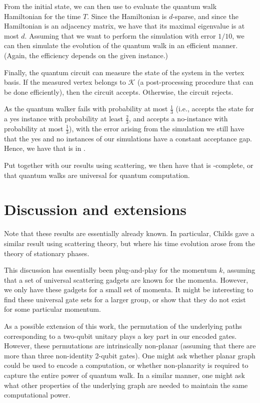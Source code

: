\documentclass[../thesis-main/thesis-main]{subfiles}
\begin{document}
From the initial state, we can then use  to evaluate the quantum walk Hamiltonian for the time $T$.  Since the Hamiltonian is $d$-sparse, and since the Hamiltonian is an adjacency matrix, we have that its maximal eigenvalue is at most $d$.  Assuming that we want to perform the simulation with error $1/10$, we can then simulate the evolution of the quantum walk in an efficient manner.  (Again, the efficiency depends on the given instance.)

Finally, the quantum circuit can measure the state of the system in the vertex basis.  If the measured vertex belongs to $\mathcal{K}$ (a post-processing procedure that can be done efficiently), then the circuit accepts.  Otherwise, the circuit rejects.

As the quantum walker fails with probability at most $\frac{1}{3}$ (i.e., accepts the state for a yes instance with probability at least $\frac{2}{3}$, and accepts a no-instance with probability at most $\frac{1}{3}$), with the error arising from the simulation we still have that the yes and no instances of our simulations have a constant acceptance gap.  Hence, we have that \QWE{} is in \BQP.

Put together with our results using scattering, we then have that \QWE{} is \BQP-complete, or that quantum walks are universal for quantum computation.


\section{Discussion and extensions}

Note that these results are essentially already known.  In particular, Childs gave a similar result using scattering theory, but where his time evolution arose from the theory of stationary phases. 

This discussion has essentially been plug-and-play for the momentum $k$, assuming that a set of universal scattering gadgets are known for the momenta.  However, we only have these gadgets for a small set of momenta.  It might be interesting to find these universal gate sets for a larger group, or show that they do not exist for some particular momentum.

As a possible extension of this work, the permutation of the underlying paths corresponding to a two-qubit unitary plays a key part in our encoded gates.  However, these permutations are intrinsically non-planar (assuming that there are more than three non-identity 2-qubit gates).  One might ask whether  planar graph could be used to encode a computation, or whether non-planarity is required to capture the entire power of quantum walk.  In a similar manner, one might ask what other properties of the underlying graph are needed to maintain the same computational power.
\end{document}
